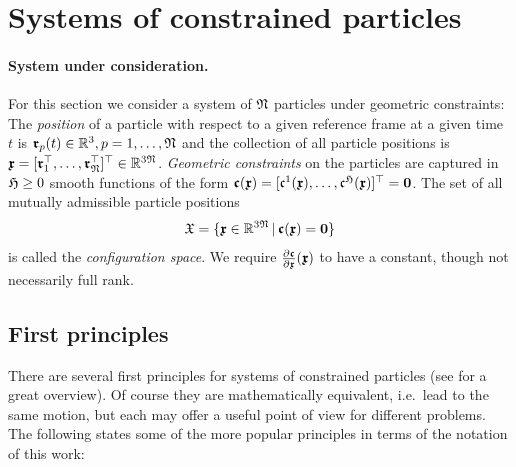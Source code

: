\section{Systems of constrained particles}\label{sec:MechConstrainedParticles}

\paragraph{System under consideration.} For this section we consider a system of $\numParticles$ particles under geometric constraints:
The \textit{position} of a particle with respect to a given reference frame at a given time $t$ is $\particlePos{\PidxI}(t) \in \RealNum^3, \PidxI = 1,\ldots,\numParticles$ and the collection of all particle positions is $\particleCoord = [\particlePos{1}^\top,\ldots,\particlePos{\numParticles}^\top]^\top \in \RealNum^{3\numParticles}$.
\textit{Geometric constraints} on the particles are captured in $\numParticleConstraints \geq 0$ smooth functions of the form $\particleGeoConstraint(\particleCoord) = [\particleGeoConstraintCoeff{1}(\particleCoord), \ldots, \particleGeoConstraintCoeff{\numParticleConstraints}(\particleCoord)]^\top = \tuple{0}$.
The set of all mutually admissible particle positions 
\begin{align}
\particleConfigSpace = \{ \particleCoord \in \RealNum^{3\numParticles} \, | \, \particleGeoConstraint(\particleCoord) = \tuple{0} \} 
\end{align}
is called the \textit{configuration space}.
We require $\pdiff[\particleGeoConstraint]{\particleCoord}(\particleCoord)$ to have a constant, though not necessarily full rank.

\subsection{First principles}\label{sec:MechConstrainedFirstPrinciples}
There are several first principles for systems of constrained particles (see \cite{Lanczos:Variational} for a great overview).
Of course they are mathematically equivalent, i.e.\ lead to the same motion, but each may offer a useful point of view for different problems.
The following states some of the more popular principles in terms of the notation of this work:

